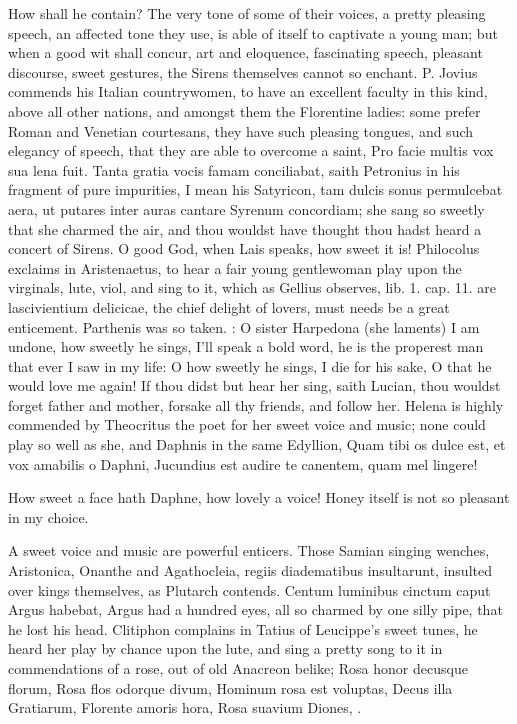 How shall he contain? The very tone of some of their voices, a pretty
pleasing speech, an affected tone they use, is able of itself to
captivate a young man; but when a good wit shall concur, art and
eloquence, fascinating speech, pleasant discourse, sweet gestures, the
Sirens themselves cannot so enchant. P. Jovius commends his
Italian countrywomen, to have an excellent faculty in this kind, above
all other nations, and amongst them the Florentine ladies: some prefer
Roman and Venetian courtesans, they have such pleasing tongues, and
such  elegancy of speech, that they are able to overcome a saint,
Pro facie multis vox sua lena fuit. Tanta gratia vocis famam
conciliabat, saith Petronius in his fragment of pure impurities,
I mean his Satyricon, tam dulcis sonus permulcebat aera, ut putares
inter auras cantare Syrenum concordiam; she sang so sweetly that she
charmed the air, and thou wouldst have thought thou hadst heard a
concert of Sirens. O good God, when Lais speaks, how sweet it is!
Philocolus exclaims in Aristenaetus, to hear a fair young gentlewoman
play upon the virginals, lute, viol, and sing to it, which as Gellius
observes, lib. 1. cap. 11. are lascivientium delicicae, the chief
delight of lovers, must needs be a great enticement. Parthenis was so
taken. : O sister
Harpedona (she laments) I am undone, how sweetly he sings, I'll
speak a bold word, he is the properest man that ever I saw in my life:
O how sweetly he sings, I die for his sake, O that he would love me
again! If thou didst but hear her sing, saith Lucian, thou
wouldst forget father and mother, forsake all thy friends, and follow
her. Helena is highly commended by Theocritus the poet for her
sweet voice and music; none could play so well as she, and Daphnis in
the same Edyllion,
Quam tibi os dulce est, et vox amabilis o Daphni,
Jucundius est audire te canentem, quam mel lingere!

How sweet a face hath Daphne, how lovely a voice!
Honey itself is not so pleasant in my choice.

A sweet voice and music are powerful enticers. Those Samian singing
wenches, Aristonica, Onanthe and Agathocleia, regiis diadematibus
insultarunt, insulted over kings themselves, as Plutarch
contends. Centum luminibus cinctum caput Argus habebat, Argus had a
hundred eyes, all so charmed by one silly pipe, that he lost his head.
Clitiphon complains in Tatius of Leucippe's sweet tunes, he heard
her play by chance upon the lute, and sing a pretty song to it in
commendations of a rose, out of old Anacreon belike;
Rosa honor decusque florum,
Rosa flos odorque divum,
Hominum rosa est voluptas,
Decus illa Gratiarum,
Florente amoris hora,
Rosa suavium Diones, \etc{}.

